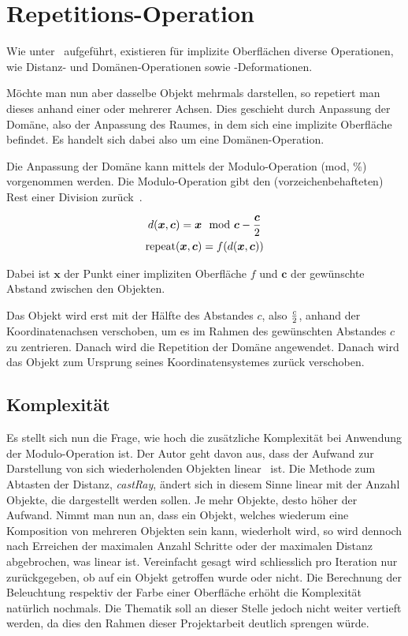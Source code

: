 \section{Repetitions-Operation}
\label{sec:rendering:modulo}

Wie unter~\cite[S. 37ff]{osterwalder_sven_volume_2016} aufgeführt, existieren
für implizite Oberflächen diverse Operationen, wie Distanz- und
Domänen-Operationen sowie -Deformationen.

Möchte man nun aber dasselbe Objekt mehrmals darstellen, so repetiert man
dieses anhand einer oder mehrerer Achsen. Dies geschieht durch Anpassung der
Domäne, also der Anpassung des Raumes, in dem sich eine implizite Oberfläche
befindet. Es handelt sich dabei also um eine Domänen-Operation.

Die Anpassung der Domäne kann mittels der Modulo-Operation (mod, \%)
vorgenommen werden. Die Modulo-Operation gibt den (vorzeichenbehafteten) Rest
einer Division zurück~\cite{maignan_integer_2008}.

\begin{gather}
    d(\bm{x}, \bm{c}) = \bm{x} \mod \bm{c} - {\bm{c} \over 2}\\
    \text{repeat}(\bm{x}, \bm{c}) = f(d(\bm{x}, \bm{c}))
\end{gather}

Dabei ist $\bm{x}$ der Punkt einer impliziten Oberfläche $f$ und $\bm{c}$ der
gewünschte Abstand zwischen den Objekten.

Das Objekt wird erst mit der Hälfte des Abstandes $c$, also $c \over 2$, anhand
der Koordinatenachsen verschoben, um es im Rahmen des gewünschten Abstandes
$c$ zu zentrieren.  Danach wird die Repetition der Domäne angewendet. Danach
wird das Objekt zum Ursprung seines Koordinatensystemes zurück verschoben.

\subsection{Komplexität}
\label{subsec:rendering:modulo:complexity}

Es stellt sich nun die Frage, wie hoch die zusätzliche Komplexität bei
Anwendung der Modulo-Operation ist. Der Autor geht davon aus, dass der Aufwand
zur Darstellung von sich wiederholenden Objekten linear~
ist. Die Methode zum Abtasten der Distanz, \textit{castRay}, ändert sich in
diesem Sinne linear mit der Anzahl Objekte, die dargestellt werden sollen. Je
mehr Objekte, desto höher der Aufwand. Nimmt man nun an, dass ein Objekt,
welches wiederum eine Komposition von mehreren Objekten sein kann, wiederholt
wird, so wird dennoch nach Erreichen der maximalen Anzahl Schritte oder der
maximalen Distanz abgebrochen, was linear ist. Vereinfacht gesagt wird
schliesslich pro Iteration nur zurückgegeben, ob auf ein Objekt getroffen wurde
oder nicht. Die Berechnung der Beleuchtung respektiv der Farbe einer Oberfläche
erhöht die Komplexität natürlich nochmals.
Die Thematik soll an dieser Stelle jedoch nicht weiter vertieft werden, da dies
den Rahmen dieser Projektarbeit deutlich sprengen würde.

